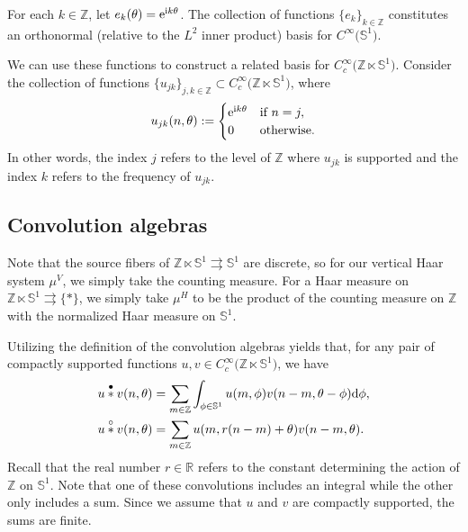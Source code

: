 \documentclass[10pt,a4paper]{amsart}
\numberwithin{equation}{section}
\theoremstyle{definition}
\newcommand{\BBR}{\mathbb{R}}
\newcommand{\BBZ}{\mathbb{Z}}
\newcommand{\BBS}{\mathbb{S}}
\newcommand{\stardot}{\overset{{\bullet}}{*}}
\newcommand{\starcirc}{\overset{\circ}{*}}
\newcommand{\grpd}{\rightrightarrows}
\begin{document}
For each $ k \in \BBZ $, let $e_k(\theta)={\rm e}^{{\rm i} k\theta}$. The collection of functions $ \{ e_k \}_{k \in \BBZ} $ constitutes an orthonormal \big(relative to the $L^2$ inner product\big) basis for $ C^\infty\big(\BBS^1\big) $.

We can use these functions to construct a related basis for $ C_c^\infty\big(\BBZ \ltimes \BBS^1\big) $. Consider the collection of functions $\{u_{jk}\}_{j,k\in\BBZ} \subset C_c^\infty\big(\BBZ \ltimes \BBS^1 \big)$, where
\begin{equation}\label{ONB-torus}
u_{jk}(n,\theta) := \begin{cases} {\rm e}^{{\rm i} k\theta} & \text{if } n=j,\\
0 & \text{otherwise}.\end{cases}
\end{equation}
In other words, the index $ j $ refers to the level of $ \BBZ $ where $ u_{jk}$ is supported and the index $ k $ refers to the frequency of $ u_{jk} $.

\subsection{Convolution algebras}
Note that the source fibers of $ \BBZ \ltimes \BBS^1 \grpd \BBS^1 $ are discrete, so for our vertical Haar system $ \mu^V $, we simply take the counting measure. For a Haar measure on $ \BBZ \ltimes \BBS^1 \grpd \{ * \} $, we simply take $ \mu^H $ to be the product of the counting measure on $ \BBZ $ with the normalized Haar measure on $ \BBS^1$.

Utilizing the definition of the convolution algebras yields that, for any pair of compactly supported functions $u,v\in C_c^\infty\big(\BBZ \ltimes \BBS^1\big)$, we have
\begin{align*} %
\begin{aligned}
&u\stardot v(n,\theta)= \sum_{m \in \BBZ} \int_{\phi \in \BBS^1} u(m,\phi)v(n-m,\theta-\phi){\rm d} \phi,\\
&u\starcirc v(n,\theta)= \sum_{m\in\BBZ} u(m,r(n-m)+\theta)v(n-m,\theta).
\end{aligned}
\end{align*}
Recall that the real number $ r \in \BBR $ refers to the constant determining the action of $ \BBZ $ on $ \BBS^1 $. Note that one of these convolutions includes an integral while the other only includes a sum. Since we assume that $ u $ and $ v $ are compactly supported, the sums are finite.
\end{document}
